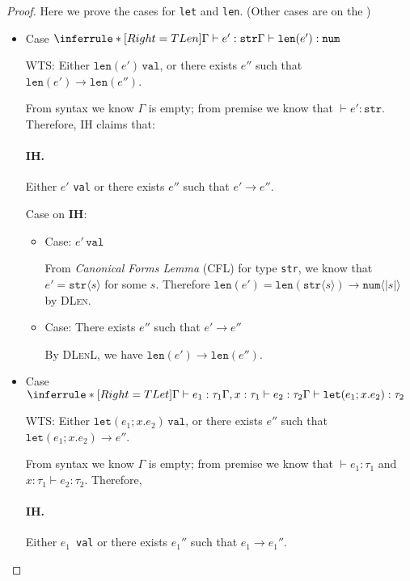 \documentclass{article}
\theoremstyle{definition}
\newcommand{\ip}[1]{\langle #1 \rangle}
\begin{document}
\begin{proof}
    Here we prove the cases for \texttt{let} and \texttt{len}. (Other cases are on the \cite{int})
    \begin{itemize}
        \item Case $\inferrule*[Right=TLen]{\Gamma \vdash e':\mathtt{str}}{\Gamma \vdash \mathtt{len}(e') : \mathtt{num}}$

              WTS: Either $\mathtt{len}(e')\, \mathtt{val}$, or there exists $e''$ such that $\mathtt{len}(e') \longrightarrow \mathtt{len}(e'')$.

              From syntax we know $\Gamma$ is empty; from premise we know that $\vdash e': \mathtt{str}$. Therefore, IH claims that:
              \paragraph*{IH.} Either $e'$ \texttt{val} or there exists $e''$ such that $e' \longrightarrow e''$.

              Case on \textbf{IH}:
              \begin{itemize}
                  \item Case: $e'\, \mathtt{val}$

                        From \emph{Canonical Forms Lemma} (CFL) for type \texttt{str}, we know that $e' = \mathtt{str}\ip{s}$ for some $s$.
                        Therefore $\mathtt{len}(e') = \mathtt{len}(\mathtt{str}\ip{s}) \longrightarrow \mathtt{num}\ip{ |s| }$ by \textsc{DLen}.
                  \item Case: There exists $e''$ such that $e' \longrightarrow e''$

                        By \textsc{DLenL}, we have $\mathtt{len}(e')\longrightarrow \mathtt{len}(e'')$.
              \end{itemize}
        \item Case $\inferrule*[Right=TLet]{\Gamma \vdash e_1:\tau_1 \\ \Gamma,x:\tau_1 \vdash e_2:\tau_2}{\Gamma \vdash \mathtt{let}(e_1;x.e_2) : \tau_2}$

              WTS: Either $\mathtt{let}(e_1;x.e_2)\, \mathtt{val}$, or there exists $e''$ such that $\mathtt{let}(e_1;x.e_2) \longrightarrow e''$.

              From syntax we know $\Gamma$ is empty; from premise we know that $\vdash e_1:\tau_1$ and $x:\tau_1 \vdash e_2:\tau_2$. Therefore,
              \paragraph*{IH.} Either $e_1$\, \texttt{val} or there exists $e_1''$ such that $e_1 \longrightarrow e_1''$.


\end{itemize}
\end{proof}
\end{document}
